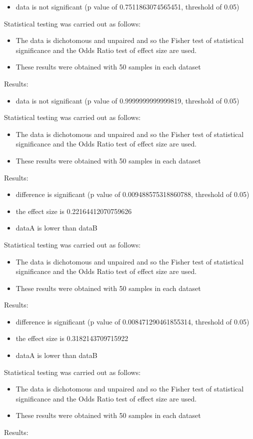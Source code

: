 \documentclass[]{article}
\begin{document}
\begin{itemize}
\item{data is not significant (p value of 0.7511863074565451, threshold of 0.05)}
\end{itemize}Statistical testing was carried out as follows: \begin{itemize}
\item{The data is dichotomous and unpaired and so the Fisher test of statistical significance and the Odds Ratio test of effect size are used.}
\item{These results were obtained with 50 samples in each dataset}
\end{itemize}Results:
\begin{itemize}
\item{data is not significant (p value of 0.9999999999999819, threshold of 0.05)}
\end{itemize}Statistical testing was carried out as follows: \begin{itemize}
\item{The data is dichotomous and unpaired and so the Fisher test of statistical significance and the Odds Ratio test of effect size are used.}
\item{These results were obtained with 50 samples in each dataset}
\end{itemize}Results:
\begin{itemize}
\item{difference is significant (p value of 0.009488575318860788, threshold of 0.05)}
\item{the effect size is 0.22164412070759626}
\item{dataA is lower than dataB}
\end{itemize}Statistical testing was carried out as follows: \begin{itemize}
\item{The data is dichotomous and unpaired and so the Fisher test of statistical significance and the Odds Ratio test of effect size are used.}
\item{These results were obtained with 50 samples in each dataset}
\end{itemize}Results:
\begin{itemize}
\item{difference is significant (p value of 0.008471290461855314, threshold of 0.05)}
\item{the effect size is 0.3182143709715922}
\item{dataA is lower than dataB}
\end{itemize}Statistical testing was carried out as follows: \begin{itemize}
\item{The data is dichotomous and unpaired and so the Fisher test of statistical significance and the Odds Ratio test of effect size are used.}
\item{These results were obtained with 50 samples in each dataset}
\end{itemize}Results:
\end{document}
